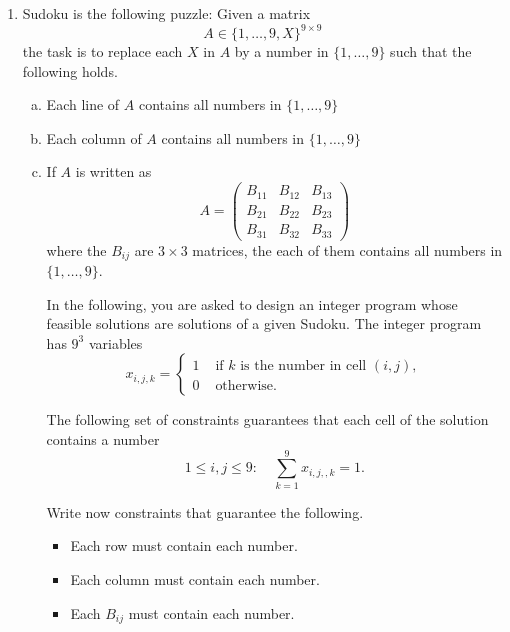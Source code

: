 \documentclass[11pt]{article}
\begin{document}
\begin{enumerate}[1)]
\item Sudoku is the following puzzle: Given a matrix
  \begin{displaymath}
    A ∈ \{1,\dots,9,X\}^{9 ×9} 
  \end{displaymath}
  the task is to replace each $X$ in $A$ by a number in $\{1,\dots,9\}$ such that the following holds.
  \begin{enumerate}[a)] 
  \item Each line of $A$ contains all numbers in  $\{1,\dots,9\}$
  \item Each column of $A$ contains all numbers in  $\{1,\dots,9\}$
  \item If $A$ is written as
    \begin{displaymath}
      A =
      \begin{pmatrix}
        B_{11} & B_{12} & B_{13} \\
        B_{21} & B_{22} & B_{23} \\
        B_{31} & B_{32} & B_{33} 
      \end{pmatrix}
    \end{displaymath}
    where the $B_{ij}$ are $3 ×3$ matrices, the each of them contains all numbers in  $\{1,\dots,9\}$.

    \bigskip \noindent

    In the following, you are asked to design an integer program whose feasible solutions are solutions of a given Sudoku. The integer program has $9^3$ variables
    \begin{displaymath}
      x_{i,j,k} =
      \begin{cases}
        1 & \text{ if } k \text{ is the number in cell } (i,j),  \\
        0 & \text{ otherwise.} 
      \end{cases}
    \end{displaymath}


    The following set of constraints guarantees that each cell of the solution contains a number
    \begin{displaymath}
      1≤i,j≤9: \quad  ∑_{k=1}^9 x_{i,j,,k} = 1. 
    \end{displaymath}

    Write now constraints that guarantee the following.
    \begin{itemize}
    \item Each row must contain each number.
    \item Each column must contain each number.
    \item Each $B_{ij}$ must contain each number. 
    \end{itemize}


\end{enumerate}
\end{enumerate}
\end{document}
